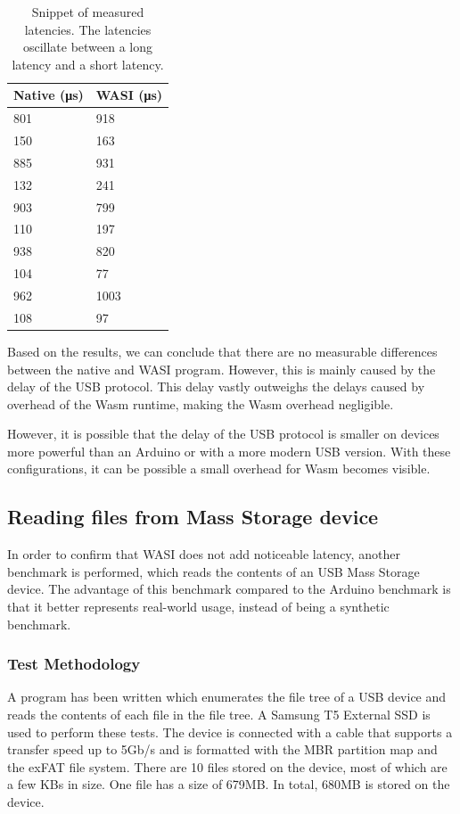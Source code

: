 \begin{table}[h!]
\centering
\begin{tabular}{|l|l|}
\hline
\textbf{Native (μs)} & \textbf{WASI (μs)} \\
\hline
801 & 918 \\
\hline
150 & 163 \\
\hline
885 & 931 \\
\hline
132 & 241 \\
\hline
903 & 799 \\
\hline
110 & 197 \\
\hline
938 & 820 \\
\hline
104 & 77 \\
\hline
962 & 1003 \\
\hline
108 & 97 \\
\hline
\end{tabular}
\caption{Snippet of measured latencies. The latencies oscillate between a long latency and a short latency.}
\label{table:arduino_output}
\end{table}

Based on the results, we can conclude that there are no measurable differences between the native and \acrshort{WASI} program. However, this is mainly caused by the delay of the USB protocol. This delay vastly outweighs the delays caused by overhead of the Wasm runtime, making the Wasm overhead negligible.

However, it is possible that the delay of the USB protocol is smaller on devices more powerful than an Arduino or with a more modern USB version. With these configurations, it can be possible a small overhead for Wasm becomes visible.

\subsection{Reading files from Mass Storage device}
\label{section:mass_storage_latency}

In order to confirm that WASI does not add noticeable latency, another benchmark is performed, which reads the contents of an USB Mass Storage device. The advantage of this benchmark compared to the Arduino benchmark is that it better represents real-world usage, instead of being a synthetic benchmark.

\subsubsection{Test Methodology}
A program has been written which enumerates the file tree of a USB device and reads the contents of each file in the file tree. A Samsung T5 External SSD is used to perform these tests. The device is connected with a cable that supports a transfer speed up to 5Gb/s and is formatted with the \acrshort{MBR} partition map and the \acrshort{exFAT} file system. There are 10 files stored on the device, most of which are a few KBs in size. One file has a size of 679MB. In total, 680MB is stored on the device.

